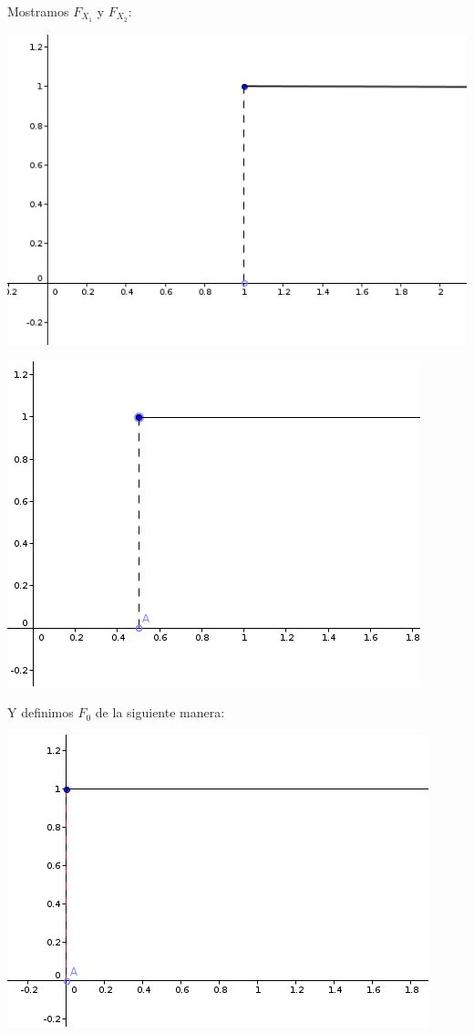 \documentclass{apuntes}
\begin{document}
\begin{enumerate}
\begin{example}
Mostramos $F_{X_1}$ y $F_{X_2}$:

\begin{center}
\includegraphics[scale=0.4]{img/g2.png}
\end{center}

\begin{center}
\includegraphics[scale=0.4]{img/g3.png}
\end{center}

Y definimos $F_0$ de la siguiente manera:

\begin{center}
\includegraphics[scale=0.4]{img/g4.png}
\end{center}


\end{example}
\end{enumerate}
\end{document}
